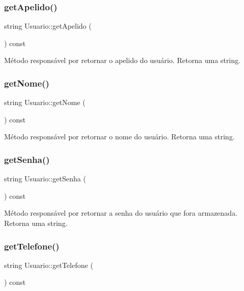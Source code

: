\subsubsection{\texorpdfstring{get\+Apelido()}{getApelido()}}
{\footnotesize\ttfamily string Usuario\+::get\+Apelido (\begin{DoxyParamCaption}{ }\end{DoxyParamCaption}) const\hspace{0.3cm}{\ttfamily [inline]}}

Método responsável por retornar o apelido do usuário. Retorna uma string. \mbox{\label{classUsuario_a6aeb8cccd96e84aedeb50a68b4f9a3d4}} 
\subsubsection{\texorpdfstring{get\+Nome()}{getNome()}}
{\footnotesize\ttfamily string Usuario\+::get\+Nome (\begin{DoxyParamCaption}{ }\end{DoxyParamCaption}) const\hspace{0.3cm}{\ttfamily [inline]}}

Método responsável por retornar o nome do usuário. Retorna uma string. \mbox{\label{classUsuario_a5a6149716b03d4b1408aaa6a0dc4bb32}} 
\subsubsection{\texorpdfstring{get\+Senha()}{getSenha()}}
{\footnotesize\ttfamily string Usuario\+::get\+Senha (\begin{DoxyParamCaption}{ }\end{DoxyParamCaption}) const\hspace{0.3cm}{\ttfamily [inline]}}

Método responsável por retornar a senha do usuário que fora armazenada. Retorna uma string. \mbox{\label{classUsuario_ae2a44b0716930c62458e6fc8c7339537}} 
\subsubsection{\texorpdfstring{get\+Telefone()}{getTelefone()}}
{\footnotesize\ttfamily string Usuario\+::get\+Telefone (\begin{DoxyParamCaption}{ }\end{DoxyParamCaption}) const\hspace{0.3cm}{\ttfamily [inline]}}

